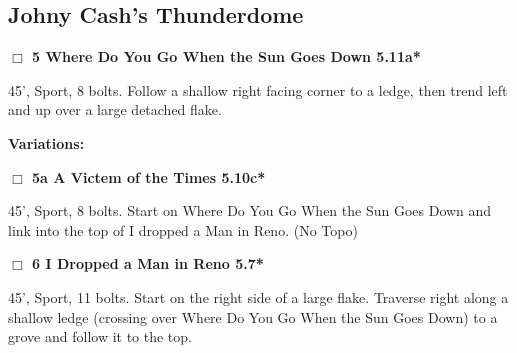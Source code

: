 	\begin{multicols}{2}

\needspace{10em}
\subsection*{Johny Cash's Thunderdome}\label{bf:Johny Cash's Thunderdome}




\needspace{2em}
\label{rt:Where Do You Go When the Sun Goes Down}
\colorbox{RoyalBlue!20}{
\parbox{0.95\linewidth}{
\hspace{-1ex}\textbf{$\Box$
5 Where Do You Go When the Sun Goes Down 5.11a*  
}}}
\begin{adjustwidth}{1.3em}{}			

45', Sport, 8 bolts. Follow a shallow right facing corner to a ledge, then trend left and up over a large detached flake.
\end{adjustwidth}


\begin{adjustwidth}{0.5cm}{}				
\needspace{4em}
\textbf{Variations:} \newline

\needspace{2em}
\label{vr:A Victem of the Times}
\colorbox{RoyalBlue!20}{
\parbox{0.95\linewidth}{
\hspace{-1ex}\textbf{$\Box$
5a A Victem of the Times 5.10c*  
}}}
\begin{adjustwidth}{1.3em}{}			

45', Sport, 8 bolts. Start on Where Do You Go When the Sun Goes Down and link into the top of I dropped a Man in Reno.
  (No Topo)
\end{adjustwidth}



\end{adjustwidth}


\needspace{2em}
\label{rt:I Dropped a Man in Reno}
\colorbox{green!20}{
\parbox{0.95\linewidth}{
\hspace{-1ex}\textbf{$\Box$
6 I Dropped a Man in Reno 5.7*  
}}}
\begin{adjustwidth}{1.3em}{}			

45', Sport, 11 bolts. Start on the right side of a large flake. Traverse right along a shallow ledge (crossing over Where Do You Go When the Sun Goes Down) to a grove and follow it to the top.
\end{adjustwidth}





\end{multicols}
